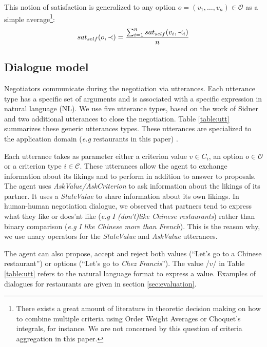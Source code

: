 \documentclass{llncs}
\begin{document}
		This notion of satisfaction is generalized to any option $o= (v_1, \ldots, v_n)\in \mathcal{O}$ as a simple average\footnote{There exists a great amount of literature in theoretic decision making on how to combine multiple criteria using Order Weight Averages or Choquet's integrals, for instance. We are not concerned by this question of criteria aggregation in this paper.}:
		\vspace{-1em} 
		\begin{equation}
		sat_{self}(o, \prec) = \frac{\sum_{i=1}^{n} sat_{self}(v_i, \prec_i) }{n}
		\vspace{-1.5em} 
		\end{equation}
		
		\subsection{Dialogue model}
		Negotiators communicate during the negotiation via utterances. Each utterance type has a specific set of arguments and is associated with a specific expression in natural language (NL). We use five utterance types, based on the work of Sidner \cite{sidner1994artificial} and two additional utterances to close the negotiation. Table \ref{table:utt} summarizes these generic utterances types. These utterances are specialized to the application domain (\emph{e.g} restaurants in this paper) .

		Each utterance takes as parameter either a criterion value $v \in C_i$, an option $o \in \mathcal{O}$ or a criterion type $i \in \mathcal{C}$. These utterances allow the agent to exchange information about its likings and to perform in addition to answer to proposals.
		The agent uses \textit{AskValue/AskCriterion} to ask information about the likings of its partner. It uses a  \textit{StateValue} to share information about its own likings. 
		In human-human negotiation dialogue, we observed that partners tend to express what they like or does'nt like (\emph{e.g} \textit{I (don't)like Chinese restaurants})  rather than binary comparison (\emph{e.g} \textit{I like Chinese more than French}). This is the reason why, we use unary operators for the \textit{StateValue} and \textit{AskValue} utterances.
		
		The agent can also propose, accept and reject both values (``Let's go to a Chinese restaurant'') or options (``Let's go to \emph{Chez Francis}''). The value /$v$/ in Table \ref{table:utt} refers to the natural language format to express a value.
		Examples of dialogues for restaurants are given in section \ref{sec:evaluation}.
		
\end{document}
